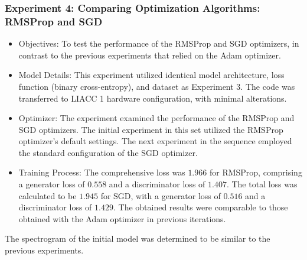 \begin{frame}
    \frametitle{Experiment 4: Comparing Optimization Algorithms: RMSProp and SGD}

    \begin{itemize}
        \item Objectives: To test the performance of the RMSProp and SGD optimizers, in contrast to the previous experiments that relied on the Adam optimizer.
        \item Model Details: This experiment utilized identical model architecture, loss function (binary cross-entropy), and dataset as Experiment 3. The code was transferred to LIACC 1 hardware configuration, with minimal alterations.
        \item Optimizer: The experiment examined the performance of the RMSProp and SGD optimizers. The initial experiment in this set utilized the RMSProp optimizer's default settings. The next experiment in the sequence employed the standard configuration of the SGD optimizer.
        \item Training Process: The comprehensive loss was $1.966$ for RMSProp, comprising a generator loss of $0.558$ and a discriminator loss of $1.407$. The total loss was calculated to be $1.945$ for SGD, with a generator loss of $0.516$ and a discriminator loss of $1.429$. The obtained results were comparable to those obtained with the Adam optimizer in previous iterations.
    \end{itemize}

    The spectrogram of the initial model was determined to be similar to the previous experiments.

\end{frame}

